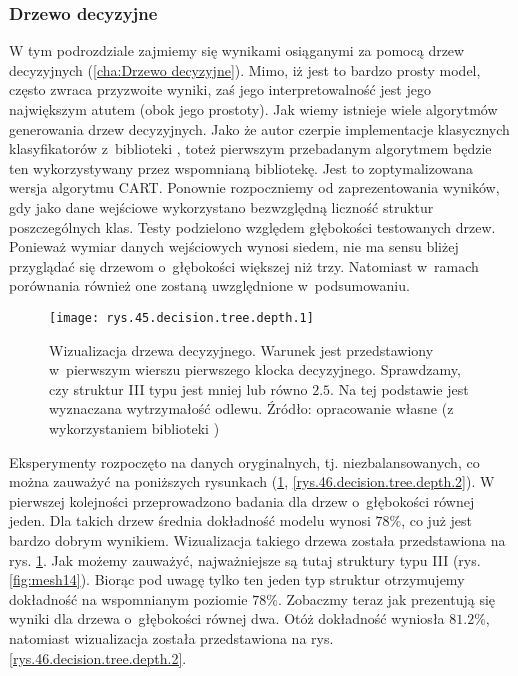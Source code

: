 \subsubsection{Drzewo decyzyjne}
\label{structures.with.dt}

W tym podrozdziale zajmiemy się wynikami osiąganymi za pomocą drzew decyzyjnych (\ref{cha:Drzewo decyzyjne}). Mimo, iż jest to bardzo prosty model, często zwraca przyzwoite wyniki, zaś jego interpretowalność jest jego największym atutem (obok jego prostoty). 
Jak wiemy istnieje wiele algorytmów generowania drzew decyzyjnych. Jako że autor czerpie implementacje klasycznych klasyfikatorów z~biblioteki , toteż pierwszym przebadanym algorytmem będzie ten wykorzystywany przez wspomnianą bibliotekę. Jest to zoptymalizowana wersja algorytmu CART.
Ponownie rozpoczniemy od zaprezentowania wyników, gdy jako dane wejściowe wykorzystano bezwzględną liczność struktur poszczególnych klas. Testy podzielono względem głębokości testowanych drzew. Ponieważ wymiar danych wejściowych wynosi siedem, nie ma sensu bliżej przyglądać się drzewom o~głębokości większej niż trzy. Natomiast w~ramach porównania również one zostaną uwzględnione w~podsumowaniu. 
\begin{figure}[h]
    \centering
    \texttt{[image: rys.45.decision.tree.depth.1]}
    \caption{Wizualizacja drzewa decyzyjnego. Warunek jest przedstawiony w~pierwszym wierszu pierwszego klocka decyzyjnego. Sprawdzamy, czy struktur III typu jest mniej lub równo $2.5$. Na tej podstawie jest wyznaczana wytrzymałość odlewu. Źródło: opracowanie własne (z wykorzystaniem biblioteki )}
    \label{rys.45.decision.tree.depth.1}
\end{figure}
Eksperymenty rozpoczęto na danych oryginalnych, tj. niezbalansowanych, co można zauważyć na poniższych rysunkach (\ref{rys.45.decision.tree.depth.1}, \ref{rys.46.decision.tree.depth.2}). W pierwszej kolejności przeprowadzono badania dla drzew o~głębokości równej jeden. Dla takich drzew średnia dokładność modelu wynosi $78\%$, co już jest bardzo dobrym wynikiem. Wizualizacja takiego drzewa została przedstawiona na rys. \ref{rys.45.decision.tree.depth.1}. 
Jak możemy zauważyć, najważniejsze są tutaj struktury typu III (rys. \ref{fig:mesh14}). Biorąc pod uwagę tylko ten jeden typ struktur otrzymujemy dokładność na wspomnianym poziomie $78\%$. Zobaczmy teraz jak prezentują się wyniki dla drzewa o~głębokości równej dwa. Otóż dokładność wyniosła $81.2\%$, natomiast wizualizacja została przedstawiona na rys. \ref{rys.46.decision.tree.depth.2}. 

